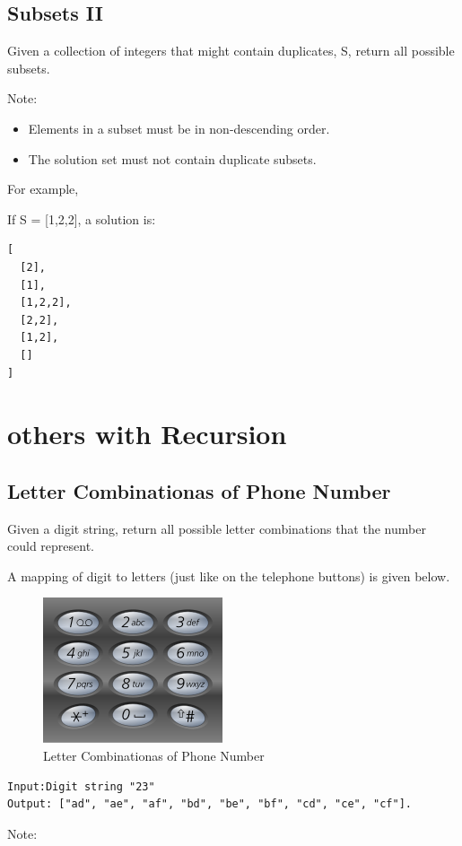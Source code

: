 \documentclass[12pt]{book}
\begin{document}
\subsection{Subsets II}
\label{sec-16-3-2}
Given a collection of integers that might contain duplicates, S, return all possible subsets.

Note:
\begin{itemize}
\item Elements in a subset must be in non-descending order.
\item The solution set must not contain duplicate subsets.
\end{itemize}
For example,

If S = [1,2,2], a solution is:
\lstset{language=java,label= ,caption= ,numbers=none}
\begin{lstlisting}
[
  [2],
  [1],
  [1,2,2],
  [2,2],
  [1,2],
  []
]
\end{lstlisting}
\section{others with Recursion}
\label{sec-16-4}
\subsection{Letter Combinationas of Phone Number}
\label{sec-16-4-1}
Given a digit string, return all possible letter combinations that the number could represent.

A mapping of digit to letters (just like on the telephone buttons) is given below.

\begin{figure}[htb]
\centering
\includegraphics[width=.9\linewidth]{./pic/phoneNumber.png}
\caption{Letter Combinationas of Phone Number}
\end{figure}
\lstset{language=java,label= ,caption= ,numbers=none}
\begin{lstlisting}
Input:Digit string "23"
Output: ["ad", "ae", "af", "bd", "be", "bf", "cd", "ce", "cf"].
\end{lstlisting}
Note:
\end{document}
